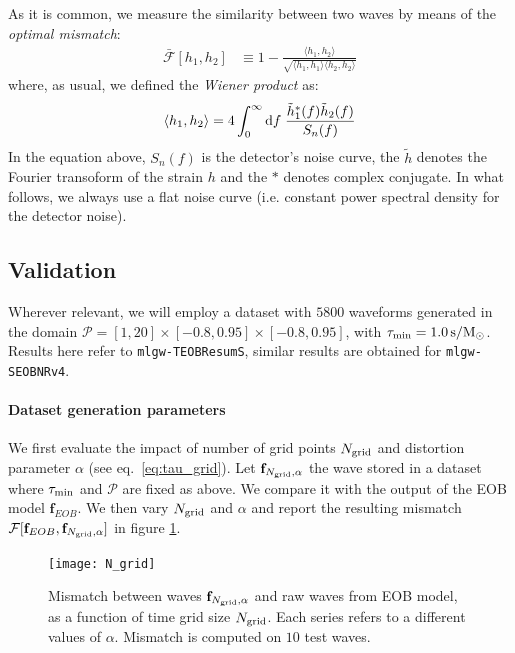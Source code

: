 As it is common, we measure the similarity between two waves by means of the \textit{optimal mismatch}:
\begin{align}
	\bar{\mathcal{F}}[h_1,h_2] &\equiv 1- \frac{\langle h_1, h_2 \rangle}{\sqrt{\langle h_1, h_1 \rangle \langle h_2, h_2 \rangle}}	\label{eq:mismatch_def}
\end{align}
where, as usual, we defined the \textit{Wiener product} as:
\begin{equation}
	 {\langle h_1, h_2 \rangle} = 4 \int_0^\infty \operatorname{d}\!{f} \; \frac{\tilde{h}_1^*(f) \tilde{h}_2(f)}{S_n(f)}
	\label{ew:Wiener}
\end{equation}
In the equation above, $S_n(f)$ is the detector's noise curve, the $\tilde{h}$ denotes the Fourier transoform of the strain $h$ and the $*$ denotes complex conjugate.
In what follows, we always use a flat noise curve (i.e. constant power spectral density for the detector noise).

\subsection{Validation}
Wherever relevant, we will employ a dataset with $5800$ waveforms generated in the domain $\mathcal{P} = [1,20]\times[-0.8,0.95]\times[-0.8,0.95]$, with $\tau_{\rm min} = \SI{1.0}{s/M_\odot}$. Results here refer to \texttt{mlgw-TEOBResumS}, similar results are obtained for \texttt{mlgw-SEOBNRv4}.
\paragraph{Dataset generation parameters}
We first evaluate the impact of number of grid points $N_{\rm grid}$ and distortion parameter $\alpha$ (see eq.~\eqref{eq:tau_grid}).
Let $\mathbf{f}_{N_{\rm grid}, \alpha}$ the wave stored in a dataset where $\tau_{\rm min}$ and $\mathcal{P}$ are fixed as above. We compare it with the output of the EOB model $\mathbf{f}_{EOB}$.
We then vary $N_{\rm grid}$ and $\alpha$ and report the resulting mismatch $\mathcal{F}[\mathbf{f}_{EOB}, \mathbf{f}_{N_{\rm grid}, \alpha}]$ in figure \ref{fig:N_grid}.
\begin{figure}[!t]
	\centering
	\texttt{[image: N\_grid]}
	\caption{Mismatch between waves $\mathbf{f}_{N_{\rm grid}, \alpha}$ and raw waves from EOB model, as a function of time grid size $N_{\rm grid}$. Each series refers to a different values of $\alpha$.
Mismatch is computed on $10$ test waves. 
}
	\label{fig:N_grid}
\end{figure}

